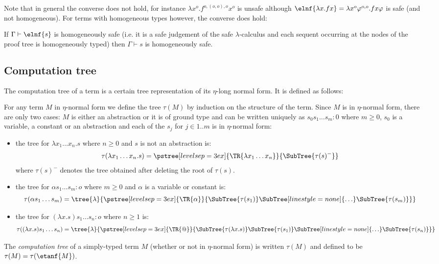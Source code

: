 Note that in general the converse does not hold, for instance $\lambda x^o . f^{o,(o,o),o} x^o$ is unsafe although $\elnf{\lambda x . f x} = \lambda x^o \varphi^{o,o} . f x \varphi$ is safe (and not homogeneous). For terms with homogeneous types however, the converse does hold:
\begin{lem}
If $\Gamma \vdash \elnf{s}$ is homogeneously safe (i.e. it is a safe judgement of the safe $\lambda$-calculus and each sequent occurring at the nodes of the proof tree is homogeneously typed) then
$\Gamma \vdash s$ is homogeneously safe.
\end{lem}


\subsection{Computation tree}
The computation tree of a term is a certain tree representation of its
$\eta$-long normal form. It is defined as follows:
\begin{dfn}
For any term $M$ in $\eta$-normal form we define the tree $\tau(M)$ by induction
on the structure of the term.
Since $M$ is in $\eta$-normal form, there are only two cases:
$M$ is either an abstraction or it is of ground type and can be written uniquely as
$s_0 s_1 \ldots s_m : 0$ where $m\geq0$,  $s_0$ is a variable, a
constant or an abstraction and each of the $s_j$ for $j\in 1..m$ is in $\eta$-normal form:
\begin{itemize}
\item the tree for $\lambda x_1 \ldots x_n. s$ where $n\geq0$ and $s$ is not an abstraction is:
$$ \tau(\lambda x_1 \ldots x_n . s) =
      \pstree[levelsep=3ex]
        { \TR{\lambda x_1 \ldots x_n} }
        { \SubTree{\tau(s)^{-}} }
$$
where $\tau(s)^{-}$ denotes the tree obtained after deleting the root of $\tau(s)$.


\item the tree for $\alpha s_1 \ldots s_m : o$ where $m\geq0$ and $\alpha$ is a variable or constant is:
$$ \tau( \alpha s_1 \ldots s_m) =
    \tree{\lambda}
    {
        \pstree[levelsep=3ex]
            { \TR{\alpha} }
            { \SubTree{\tau(s_1)} \SubTree[linestyle=none]{\ldots} \SubTree{\tau(s_m)}
            }
    }
$$


\item the tree for $(\lambda x.s) s_1 \ldots s_n : o$ where $n \geq 1$ is:
$$ \tau((\lambda x.s) s_1 \ldots s_n) =
    \tree{\lambda}
    {
        \pstree[levelsep=3ex]
            { \TR{@} }
            {
            \SubTree{\tau(\lambda x.s)}    \SubTree{\tau(s_1)} \SubTree[linestyle=none]{\ldots} \SubTree{\tau(s_n)}
            }
    }
$$
\end{itemize}

The \emph{computation tree} of a simply-typed term $M$ (whether or not in $\eta$-normal form) is written $\tau(M)$
and defined to be $\tau(M) = \tau(\etanf{M})$.
\end{dfn}

